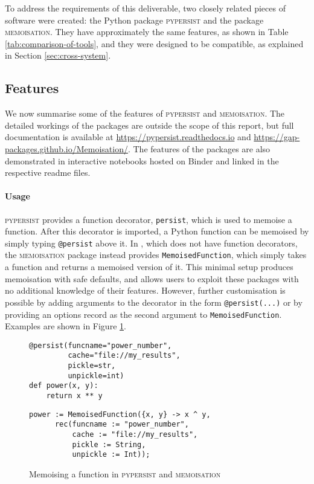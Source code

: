 \documentclass{deliverablereport}
\newcommand{\pypersist}{\textsc{pypersist}}
\newcommand{\Memoisation}{\textsc{memoisation}}
\begin{document}
To address the requirements of this deliverable, two closely related pieces of
software were created: the Python package \pypersist{} and the \GAP package
\Memoisation{}.  They have approximately the same features, as shown in Table
\ref{tab:comparison-of-tools}, and they were designed to be compatible, as
explained in Section \ref{sec:cross-system}.

\subsection{Features}
\label{sec:features}

We now summarise some of the features of \pypersist{} and \Memoisation{}.  The
detailed workings of the packages are outside the scope of this report, but full
documentation is available at \url{https://pypersist.readthedocs.io} and
\url{https://gap-packages.github.io/Memoisation/}.  The features of the packages
are also demonstrated in interactive notebooks hosted on Binder and linked in
the respective readme files.

\paragraph{Usage}
\pypersist{} provides a function decorator, \texttt{persist}, which is used to
memoise a function.  After this decorator is imported, a Python function can be
memoised by simply typing \texttt{@persist} above it.  In \GAP, which does not
have function decorators, the \Memoisation{} package instead provides
\texttt{MemoisedFunction}, which simply takes a function and returns a memoised
version of it.  This minimal setup produces memoisation with safe defaults, and
allows users to exploit these packages with no additional knowledge of their
features.  However, further customisation is possible by adding arguments to the
decorator in the form \texttt{@persist(...)} or by providing an options record
as the second argument to \texttt{MemoisedFunction}.  Examples are shown in
Figure \ref{fig:how-to-call}.

\begin{figure}[h]
  \centering
  \begin{minipage}[t]{.45\textwidth}
    {\tiny
    \begin{verbatim}
@persist(funcname="power_number",
         cache="file://my_results",
         pickle=str,
         unpickle=int)
def power(x, y):
    return x ** y
    \end{verbatim}
    }
  \end{minipage}
  \quad
  \begin{minipage}[t]{.45\textwidth}
    {\tiny
    \begin{verbatim}
power := MemoisedFunction({x, y} -> x ^ y,
      rec(funcname := "power_number",
          cache := "file://my_results",
          pickle := String,
          unpickle := Int));
    \end{verbatim}
    }
  \end{minipage}
  \caption{Memoising a function in \pypersist{} and \Memoisation{}}
  \label{fig:how-to-call}
\end{figure}
\end{document}
